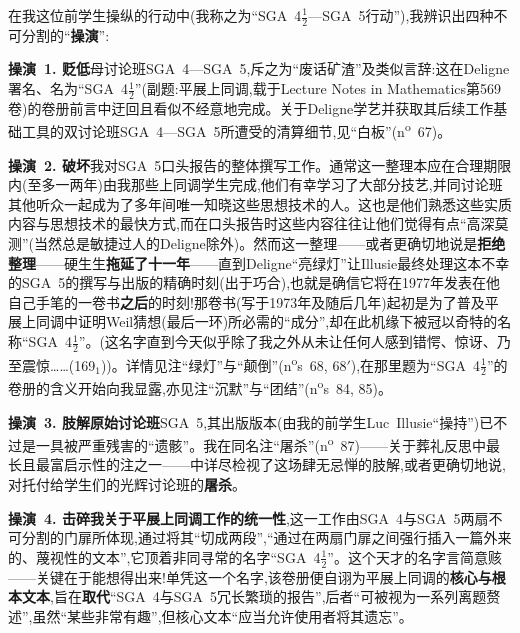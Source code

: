 在我这位前学生操纵的行动中(我称之为“SGA~4$\frac{1}{2}$—SGA~5行动”),我辨识出四种不可分割的“\textbf{操演}”:

\textbf{操演~1. 贬低}母讨论班\dmark{}SGA~4—SGA~5,斥之为“废话矿渣”及类似言辞:这在Deligne署名、名为“SGA~4$\frac{1}{2}$”(副题:平展上同调,载于Lecture Notes in Mathematics第569卷)的卷册前言中迂回且看似不经意地完成。关于Deligne学艺并获取其后续工作基础工具的双讨论班SGA~4—SGA~5所遭受的清算细节,见“白板”(n\textsuperscript{o}~67)。

\textbf{操演~2. 破坏}我对SGA~5口头报告的整体撰写工作。通常这一整理本应在合理期限内(至多一两年)由我那些上同调学生完成,他们有幸学习了大部分技艺,并同讨论班其他听众一起成为了多年间唯一知晓这些思想技术的人。这也是他们熟悉这些实质内容与思想技术的最快方式,而在口头报告时这些内容往往让他们觉得有点“高深莫测”(当然总是敏捷过人的Deligne除外)。然而这一整理——或者更确切地说是\textbf{拒绝整理}——硬生生\textbf{拖延了十一年}——直到Deligne“亮绿灯”让Illusie最终处理这本不幸的SGA~5的撰写与出版的精确时刻(出于巧合),也就是确信它将在1977年发表在他自己手笔的一卷书\textbf{之后}的时刻!那卷书(写于1973年及随后几年)起初是为了普及平展上同调中证明Weil猜想(最后一环)所必需的“成分”,却在此机缘下被冠以奇特的名称“SGA~4$\frac{1}{2}$”。(这名字直到今天似乎除了我之外\dmark{}从未让任何人感到错愕、惊讶、乃至震惊……(169$_1$))。详情见注“绿灯”与“颠倒”(n\textsuperscript{o}s~68, 68$'$),在那里题为“SGA~4$\frac{1}{2}$”的卷册的含义开始向我显露,亦见注“沉默”与“团结”(n\textsuperscript{o}s~84, 85)。

\textbf{操演~3. 肢解原始讨论班}SGA~5,其出版版本(由我的前学生Luc~Illusie“操持”)已不过是一具被严重残害的“遗骸”。我在同名注“屠杀”(n\textsuperscript{o}~87)——关于葬礼反思中最长且最富启示性的注之一——中详尽检视了这场肆无忌惮的肢解,或者更确切地说,对托付给学生们的光辉讨论班的\textbf{屠杀}。

\textbf{操演~4. 击碎我关于平展上同调工作的统一性},这一工作由SGA~4与SGA~5两扇不可分割的门扉所体现,通过将其“切成两段”,“通过在两扇门扉之间强行插入一篇外来的、蔑视性的文本”,它顶着非同寻常的名字“SGA~4$\frac{1}{2}$”。这个天才的名字言简意赅——关键在于能想得出来!单凭这一个名字,该卷册便自诩为平展上同调的\textbf{核心与根本文本},旨在\textbf{取代}“SGA~4与SGA~5冗长繁琐的报告”,后者“可被视为一系列离题赘述”,虽然“某些非常有趣”,但核心文本“应当允许使用者将其遗忘”。

